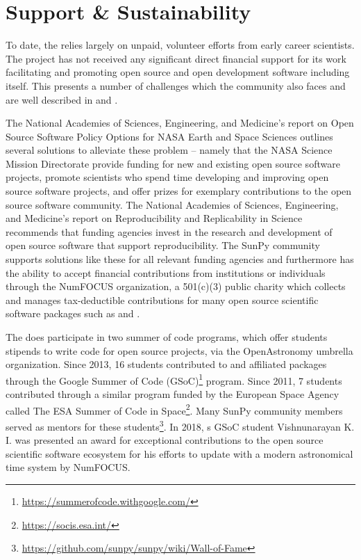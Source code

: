 \section{Support \& Sustainability}
\label{sec:support}

To date, the \sunpyproj relies largely on unpaid, volunteer efforts from early career scientists.
The project has not received any significant direct financial support for its work facilitating and promoting open source and open development software including \sunpypkg itself.
This presents a number of challenges which the \astropy community also faces and are well described in \cite{PriceWhelan:2018ji} and \cite{Muna2016}.

The National Academies of Sciences, Engineering, and Medicine's report on Open Source Software Policy Options for NASA Earth and Space Sciences \citep{NAP2018} outlines several solutions to alleviate these problem -- namely that the NASA Science Mission Directorate provide funding for new and existing open source software projects, promote scientists who spend time developing and improving open source software projects, and offer prizes for exemplary contributions to the open source software community.
The National Academies of Sciences, Engineering, and Medicine's report on Reproducibility and Replicability in Science \citep{NAP2019} recommends that funding agencies invest in the research and development of open source software that support reproducibility.
The SunPy community supports solutions like these for all relevant funding agencies and furthermore has the ability to accept financial contributions from institutions or individuals through the NumFOCUS organization, a 501(c)(3) public charity which collects and manages tax-deductible contributions for many open source scientific software packages such as \numpy and \astropy.

The \sunpyproj does participate in two summer of code programs, which offer students stipends to write code for open source projects, via the OpenAstronomy umbrella organization.
Since 2013, 16 students contributed to \sunpypkg and affiliated packages through the Google Summer of Code (GSoC)\footnote{\url{https://summerofcode.withgoogle.com/}} program.
Since 2011, 7 students contributed through a similar program funded by the European Space Agency called The ESA Summer of Code in Space\footnote{\url{https://socis.esa.int/}}.
Many SunPy community members served as mentors for these students\footnote{\url{https://github.com/sunpy/sunpy/wiki/Wall-of-Fame}}.
In 2018, s GSoC student Vishnunarayan K. I. was presented an award for exceptional contributions to the open source scientific software ecosystem for his efforts to update \sunpypkg with a modern astronomical time system by NumFOCUS.
